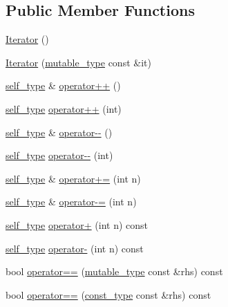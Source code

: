 \subsection*{Public Member Functions}
\begin{DoxyCompactItemize}
\item 
\hyperlink{classpanda_1_1utils_1_1Iterator_a553c8a95c45984c2a4f48f88441a0fc9}{Iterator} ()
\item 
\hyperlink{classpanda_1_1utils_1_1Iterator_ae2d340a932bb75d0f976a05b751b8004}{Iterator} (\hyperlink{classpanda_1_1utils_1_1Iterator}{mutable\_\-type} const \&it)
\item 
\hyperlink{classpanda_1_1utils_1_1Iterator}{self\_\-type} \& \hyperlink{classpanda_1_1utils_1_1Iterator_a4eb53779fe25646b72d1cbe9cab3c724}{operator++} ()
\item 
\hyperlink{classpanda_1_1utils_1_1Iterator}{self\_\-type} \hyperlink{classpanda_1_1utils_1_1Iterator_a49288cb09036ba77ee9a4e58ce320507}{operator++} (int)
\item 
\hyperlink{classpanda_1_1utils_1_1Iterator}{self\_\-type} \& \hyperlink{classpanda_1_1utils_1_1Iterator_a96e8ebf69342e0036f7197fdbc9ed775}{operator-\/-\/} ()
\item 
\hyperlink{classpanda_1_1utils_1_1Iterator}{self\_\-type} \hyperlink{classpanda_1_1utils_1_1Iterator_a9fc09ba0942a647bf1c6a493de4057cd}{operator-\/-\/} (int)
\item 
\hyperlink{classpanda_1_1utils_1_1Iterator}{self\_\-type} \& \hyperlink{classpanda_1_1utils_1_1Iterator_a0ddae9be72f0c2644c2c2d72ee0ae51b}{operator+=} (int n)
\item 
\hyperlink{classpanda_1_1utils_1_1Iterator}{self\_\-type} \& \hyperlink{classpanda_1_1utils_1_1Iterator_a6cde570ecd522b49d39c8aca8aa8c9c7}{operator-\/=} (int n)
\item 
\hyperlink{classpanda_1_1utils_1_1Iterator}{self\_\-type} \hyperlink{classpanda_1_1utils_1_1Iterator_a32ddcf2f54f2bb722cb62871759a6a84}{operator+} (int n) const 
\item 
\hyperlink{classpanda_1_1utils_1_1Iterator}{self\_\-type} \hyperlink{classpanda_1_1utils_1_1Iterator_a53cc020359c8394259d057eb53307be9}{operator-\/} (int n) const 
\item 
bool \hyperlink{classpanda_1_1utils_1_1Iterator_a9cab267a4d1b5a471bc6540bdc995463}{operator==} (\hyperlink{classpanda_1_1utils_1_1Iterator}{mutable\_\-type} const \&rhs) const 
\item 
bool \hyperlink{classpanda_1_1utils_1_1Iterator_a5ae13156bc0d6d19dcc81bce8df39bae}{operator==} (\hyperlink{classpanda_1_1utils_1_1Iterator}{const\_\-type} const \&rhs) const 

\end{DoxyCompactItemize}
